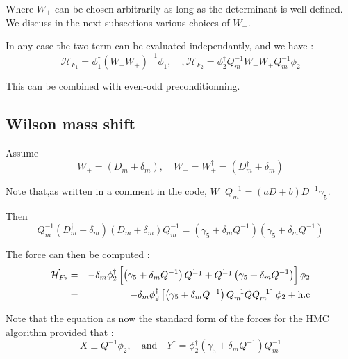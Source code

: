 \documentclass{article}[12pt]
\begin{document}
Where $W_{\pm}$ can be chosen arbitrarily as long as the determinant
is well defined. We discuss in the next subsections various choices of
$W_{\pm}$.

In any case the two term can be evaluated independantly, and we have :
\begin{equation}
\mathcal{H}_{F_1} =   \phi_1^\dagger ( W_- W_+ )^{-1} \phi_1,\quad,
\mathcal{H}_{F_2} = \phi_2^\dagger Q_m^{-1} W_- W_+ Q_m^{-1} \phi_2
\end{equation}


This can be combined with even-odd preconditionning.
\subsection{Wilson mass shift}
Assume
\begin{equation}
W_{+} = \left( D_m + \delta_m\right) ,\quad W_{-} =
W_{+}^\dagger=  \left( D^{\dagger}_m + \delta_m\right) 
\end{equation}


Note that,as written in a comment in the code,  $W_+ Q_m^{-1} = (a D +
b ) D^{-1} \gamma_5$.

Then
\begin{equation}
  Q_m^{-1} \left( D^\dagger_m + \delta_m\right)  \left( D_m +
   \delta_m  \right) Q_m^{-1}   =  \left( \gamma_5 + \delta_m Q^{-1}
   \right)  \left( \gamma_5 +    \delta_m Q^{-1}\right)  
\end{equation}


The force can then be computed :
\begin{eqnarray}
 \dot{\mathcal{H}_{F_2}}  &=&  - \delta_m \phi_2^\dagger \left[  \left( \gamma_5 + \delta_m Q^{-1}
   \right) \dot{Q^{-1}} + \dot{Q^{-1}} \left( \gamma_5 + \delta_m Q^{-1}
   \right)   \right] \phi_2 \\
&=&  - \delta_m \phi_2^\dagger \left[  \left( \gamma_5 + \delta_m
    Q^{-1}\right) Q_m^{-1} \dot{Q} Q_m^{-1}  \right]\phi_2 + \rm{h.c}
  \end{eqnarray}

Note that the equation as now the standard form of the forces for the
HMC algorithm provided that :
\begin{equation}
X\equiv Q^{-1}\phi_2,\quad\textrm{and}\quad Y^{\dagger}=\phi_2^\dagger
(\gamma_5 + \delta_m Q^{-1}) Q_m^{-1}
\end{equation}
\end{document}
